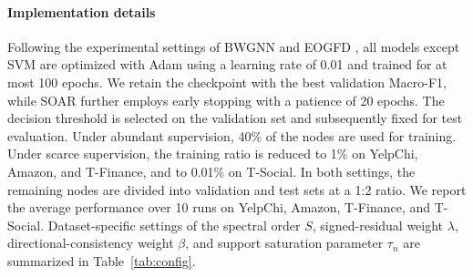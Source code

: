 \documentclass[10pt,journal]{IEEEtran}
\begin{document}
\paragraph{Implementation details}
Following the experimental settings of BWGNN \cite{tang2022bwgnn} and
EOGFD \cite{wang2026eogfd}, all models except SVM are optimized with Adam
\cite{kingma2015adam} using a learning rate of 0.01 and trained for at most
100 epochs. We retain the checkpoint with the best validation Macro-F1, while
SOAR further employs early stopping with a patience of 20 epochs. The
decision threshold is selected on the validation set and subsequently fixed
for test evaluation. Under abundant supervision, 40\% of the nodes are used for training. Under
scarce supervision, the training ratio is reduced to 1\% on YelpChi, Amazon,
and T-Finance, and to 0.01\% on T-Social. In both settings, the remaining
nodes are divided into validation and test sets at a 1:2 ratio. We report the
average performance over 10 runs on YelpChi, Amazon, T-Finance, and T-Social.
Dataset-specific settings of the spectral order $S$, signed-residual weight
$\lambda$, directional-consistency weight $\beta$, and support saturation
parameter $\tau_n$ are summarized in Table~\ref{tab:config}.
\end{document}

